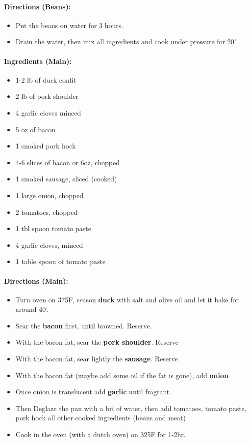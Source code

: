 \documentclass{article}
\begin{document}
\paragraph{Directions (Beans):}
\begin{itemize}
	\item Put the beans on water for 3 hours.
	\item Drain the water, then mix all ingredients and cook under pressure for 20'
\end{itemize}

\paragraph{Ingredients (Main):}
\begin{itemize}
	\item 1-2 lb of duck confit	
	\item 2 lb of pork shoulder
	\item 4 garlic cloves minced
	\item 5 oz of bacon
	\item 1 smoked pork hock
	\item 4-6 slices of bacon or 6oz, chopped
	\item 1 smoked sausage, sliced (cooked)
	\item 1 large onion, chopped
	\item 2 tomatoes, chopped
	\item 1 tbl spoon tomato paste
	\item 4 garlic cloves, minced
	\item 1 table spoon of tomato paste
\end{itemize}

\paragraph{Directions (Main):}
\begin{itemize}
	\item Turn oven on 375F, season \textbf{duck} with salt and olive oil and let it bake for around 40'.
	\item Sear the \textbf{bacon} first, until browned. Reserve.
	\item With the bacon fat, sear the \textbf{pork shoulder}. Reserve
	\item With the bacon fat, sear lightly the \textbf{sausage}. Reserve
	\item With the bacon fat (maybe add some oil if the fat is gone), add \textbf{onion}
	\item Once onion is translucent add \textbf{garlic} until fragrant.
	\item Then Deglaze the pan with a bit of water, then add tomatoes, tomato paste, pork hock all other cooked ingredients (beans and meat)
	\item Cook in the oven (with a dutch oven) on 325F for 1-2hr.
\end{itemize}
\end{document}

